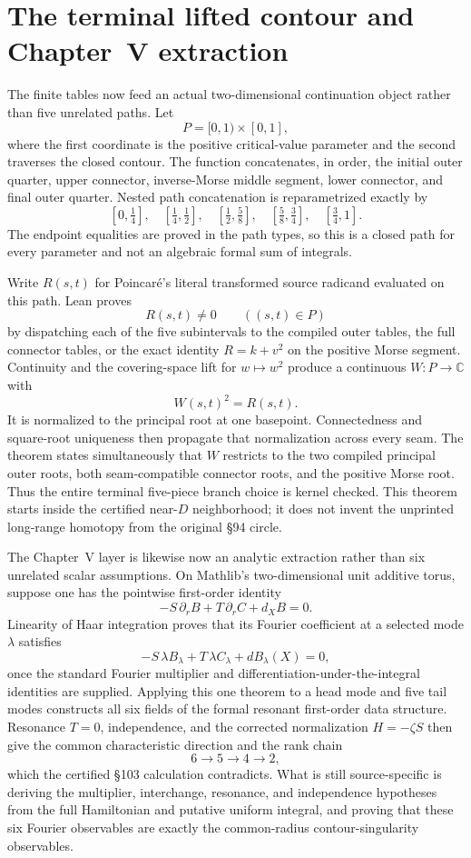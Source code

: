\documentclass[11pt]{article}
\begin{document}
\section{The terminal lifted contour and Chapter~V extraction}

The finite tables now feed an actual two-dimensional continuation object rather than five
unrelated paths.  Let
\[
  P=[0,1)\times[0,1],
\]
where the first coordinate is the positive critical-value parameter and the second traverses the
closed contour.  The function  concatenates, in order, the initial
outer quarter, upper connector, inverse-Morse middle segment, lower connector, and final outer
quarter.  Nested path concatenation is reparametrized exactly by
\[
 [0,\tfrac14],\quad [\tfrac14,\tfrac12],\quad
 [\tfrac12,\tfrac58],\quad [\tfrac58,\tfrac34],\quad
 [\tfrac34,1].
\]
The endpoint equalities are proved in the path types, so this is a closed path for every parameter
and not an algebraic formal sum of integrals.

Write $R(s,t)$ for Poincar\'e's literal transformed source radicand evaluated on this path.
Lean proves
\[
  R(s,t)\ne0\qquad ((s,t)\in P)
\]
by dispatching each of the five subintervals to the compiled outer tables, the full connector
tables, or the exact identity $R=k+v^2$ on the positive Morse segment.  Continuity and the
covering-space lift for $w\mapsto w^2$ produce a continuous $W:P\to\mathbb C$ with
\[
  W(s,t)^2=R(s,t).
\]
It is normalized to the principal root at one basepoint.  Connectedness and square-root
uniqueness then propagate that normalization across every seam.  The theorem
 states simultaneously that $W$ restricts to the
two compiled principal outer roots, both seam-compatible connector roots, and the positive Morse
root.  Thus the entire terminal five-piece branch choice is kernel checked.  This theorem starts
inside the certified near-$D$ neighborhood; it does not invent the unprinted long-range homotopy
from the original \S94 circle.

The Chapter~V layer is likewise now an analytic extraction rather than six unrelated scalar
assumptions.  On Mathlib's two-dimensional unit additive torus, suppose one has the pointwise
first-order identity
\[
 -S\,\partial_r B+T\,\partial_r C+d_XB=0.
\]
Linearity of Haar integration proves that its Fourier coefficient at a selected mode \(\lambda\)
satisfies
\[
 -S\,\lambda B_\lambda+T\,\lambda C_\lambda+dB_\lambda(X)=0,
\]
once the standard Fourier multiplier and differentiation-under-the-integral identities are
supplied.  Applying this one theorem to a head mode and five tail modes constructs all six fields
of the formal resonant first-order data structure.  Resonance $T=0$, independence, and the corrected
normalization $H=-\zeta S$ then give the common characteristic direction and the rank chain
\[
  6\longrightarrow5\longrightarrow4\longrightarrow2,
\]
which the certified \S103 calculation contradicts.  What is still source-specific is deriving
the multiplier, interchange, resonance, and independence hypotheses from the full Hamiltonian
and putative uniform integral, and proving that these six Fourier observables are exactly the
common-radius contour-singularity observables.
\end{document}
